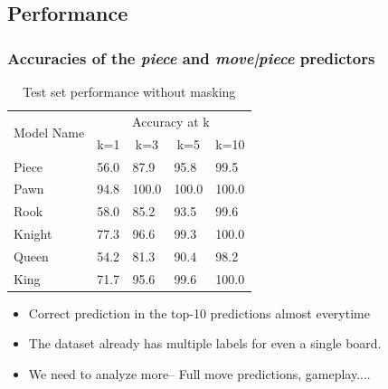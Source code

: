 \documentclass[9pt, unknownkeysallowed]{beamer}
\begin{document}
\subsection{Performance}
\begin{frame}
 \frametitle{Accuracies of the \textit{piece} and \textit{move|piece} 
predictors}
\begin{table}[H]
\centering
\begin{tabular}{@{}lllll@{}}
\toprule
\multirow{2}{*}{Model Name} & \multicolumn{4}{c}{Accuracy at k}                 
 
                                                    \\ \cmidrule(l){2-5} 
                            & \multicolumn{1}{c}{k=1} & \multicolumn{1}{c}{k=3} 
& \multicolumn{1}{c}{k=5} & \multicolumn{1}{c}{k=10} \\ \midrule
Piece                       & 56.0                    & 87.9                    
& 95.8                    & 99.5                     \\
Pawn                        & 94.8                    & 100.0                   
& 100.0                   & 100.0                    \\
Rook                        & 58.0                    & 85.2                    
& 93.5                    & 99.6                     \\
Knight                      & 77.3                    & 96.6                    
& 99.3                    & 100.0                    \\
Queen                       & 54.2                    & 81.3                    
& 90.4                    & 98.2                     \\
King                        & 71.7                    & 95.6                    
& 99.6                    & 100.0                    \\ \bottomrule
\end{tabular}
\caption{Test set performance without masking}
\label{table:performance}
\end{table}
\begin{itemize}
 \item Correct prediction in the top-10 predictions almost everytime
 \item The dataset already has multiple labels for even a single board.
 \item We need to analyze more-- Full move predictions, gameplay....
\end{itemize}

\end{frame}
\end{document}
